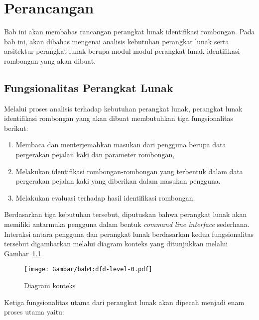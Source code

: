 \chapter{Perancangan}
\label{chap:perancangan}

Bab ini akan membahas rancangan perangkat lunak identifikasi rombongan. Pada bab ini, akan dibahas mengenai analisis kebutuhan perangkat lunak serta arsitektur perangkat lunak berupa modul-modul perangkat lunak identifikasi rombongan yang akan dibuat.

\section{Fungsionalitas Perangkat Lunak}
\label{sec:functionality}

Melalui proses analisis terhadap kebutuhan perangkat lunak, perangkat lunak identifikasi rombongan yang akan dibuat membutuhkan tiga fungsionalitas berikut:

\begin{enumerate}
    \item Membaca dan menterjemahkan masukan dari pengguna berupa data pergerakan pejalan kaki dan parameter rombongan,
    \item Melakukan identifikasi rombongan-rombongan yang terbentuk dalam data pergerakan pejalan kaki yang diberikan dalam masukan pengguna.
    \item Melakukan evaluasi terhadap hasil identifikasi rombongan.
\end{enumerate}

Berdasarkan tiga kebutuhan tersebut, diputuskan bahwa perangkat lunak akan memiliki antarmuka pengguna dalam bentuk \textit{command line interface} sederhana. Interaksi antara pengguna dan perangkat lunak berdasarkan kedua fungsionalitas tersebut digambarkan melalui diagram konteks yang ditunjukkan melalui Gambar~\ref{bab4:context-diagram}.

\begin{figure}[htbp]
    \centering
    \texttt{[image: Gambar/bab4:dfd-level-0.pdf]}
    \caption{Diagram konteks}
    \label{bab4:context-diagram}
\end{figure}

\noindent Ketiga fungsionalitas utama dari perangkat lunak akan dipecah menjadi enam proses utama yaitu:

